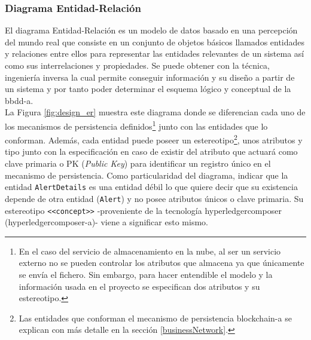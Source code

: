 \documentclass[12pt,a4paper, twoside]{report}
\begin{document}
	\subsubsection{Diagrama Entidad-Relación}
	
	El diagrama Entidad-Relación es un modelo de datos basado en una percepción del mundo real que consiste en un conjunto de objetos básicos llamados entidades y relaciones entre ellos para representar las entidades relevantes de un sistema así como sus interrelaciones y propiedades. Se puede obtener con la técnica, ingeniería inversa la cual permite conseguir información y su diseño a partir de un sistema y por tanto poder determinar el esquema lógico y conceptual de la \gls{bbdd-a}. \\
	
	La Figura \ref{fig:design_er} muestra este diagrama donde se diferencian cada uno de los mecanismos de persistencia definidos\footnote{En el caso  del servicio de almacenamiento en la nube, al ser un servicio externo no se pueden controlar los atributos que almacena ya que únicamente se envía el fichero. Sin embargo, para hacer entendible el modelo y la información usada en el proyecto se especifican dos atributos y su estereotipo.} junto con las entidades que lo conforman. Además, cada entidad puede poseer un estereotipo\footnote{Las entidades que conforman el mecanismo de persistencia \gls{blockchain-a} se explican con más detalle en la sección \ref{businessNetwork}.}, unos atributos y tipo junto con la especificación en caso de existir del atributo que actuará como clave primaria o PK (\textit{Public Key}) para identificar un registro único en el mecanismo de persistencia. Como particularidad del diagrama, indicar que la entidad \texttt{AlertDetails} es una entidad débil lo que quiere decir que su existencia depende de otra entidad (\texttt{Alert}) y no posee atributos únicos o clave primaria. Su estereotipo \texttt{<<concept>>} -proveniente de la tecnología \gls{hyperledgercomposer} (\gls{hyperledgercomposer-a})- viene a significar esto mismo.
	
\end{document}
